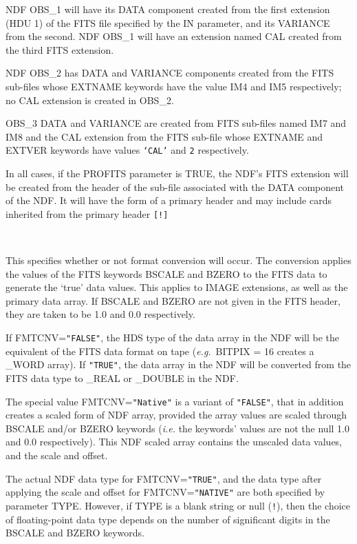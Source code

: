 \documentclass[twoside,11pt]{article}
\newcommand{\sstsubsection}[1]{ \item[{#1}] \mbox{} \\}
\newcommand{\sstsubsection}[1]{\item[{#1}]}
\begin{document}
{{{        NDF OBS\_1 will have its DATA component created from the first
        extension  (HDU 1) of the FITS file specified by the IN parameter,
        and its VARIANCE from the second.  NDF OBS\_1 will have an extension
        named CAL created from the third FITS extension.

        NDF OBS\_2 has DATA and VARIANCE components created from the FITS
        sub-files whose EXTNAME keywords have the value IM4 and IM5
        respectively; no CAL extension is created in OBS\_2.

        OBS\_3 DATA and VARIANCE are created from FITS sub-files named IM7 and
        IM8 and the CAL extension from the FITS sub-file whose EXTNAME and
        EXTVER keywords have values \texttt{`CAL'} and \texttt{2} respectively.

        In all cases, if the PROFITS parameter is TRUE, the NDF's FITS
        extension will be created from the header of the sub-file
        associated with the DATA component of the NDF. It will have the
        form of a primary header and may include cards inherited from the
        primary header \texttt{[!]}
      }   
   \sstsubsection{
         FMTCNV = LITERAL (Read)
      }{
         This specifies whether or not format conversion will occur.
         The conversion applies the values of the FITS keywords BSCALE
         and BZERO to the FITS data to generate the `true' data values.
         This applies to IMAGE extensions, as well as the primary data
         array.  If BSCALE and BZERO are not given in the FITS header,
         they are taken to be 1.0 and 0.0 respectively.

         If FMTCNV=\texttt{"FALSE"}, the HDS type of the data array in the NDF
         will be the equivalent of the FITS data format on tape
         ({\em{e.g.}}\ BITPIX = 16 creates a \_WORD array).  If \texttt{"TRUE"},
         the data array in the NDF will be converted from the FITS data
         type to \_REAL or \_DOUBLE in the NDF.

         The special value FMTCNV=\texttt{"Native"} is a variant of \texttt{"FALSE"}, 
         that in addition creates a scaled form of NDF array, provided
         the array values are scaled through BSCALE and/or BZERO 
         keywords (\emph{i.e.} the keywords' values are not the null 1.0 
         and 0.0 respectively).  This NDF scaled array contains the 
         unscaled data values, and the scale and offset.

         The actual NDF data type for FMTCNV=\texttt{"TRUE"}, and the data 
         type after applying the scale and offset for FMTCNV=\texttt{"NATIVE"}
         are both specified by parameter TYPE.  However, if TYPE is a
         blank string or null ({\tt{!}}), then the choice of floating-point
         data type depends on the number of significant digits
         in the BSCALE and BZERO keywords.

}}}
\end{document}
